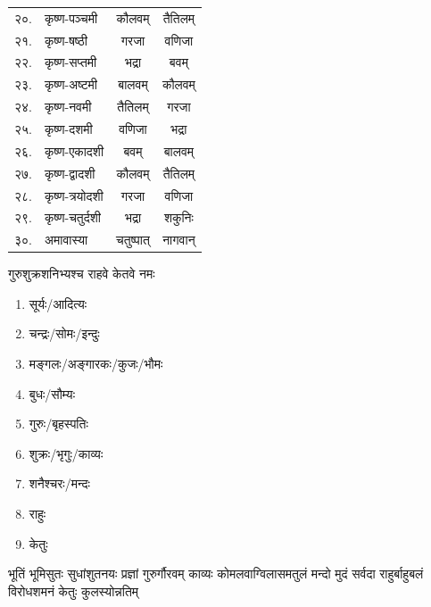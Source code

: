 \begin{longtable}{llcc}
  २०. & कृष्ण-पञ्चमी   & कौलवम्       & तैतिलम्        \\
  २१. & कृष्ण-षष्ठी    & गरजा        & वणिजा        \\
  २२. & कृष्ण-सप्तमी   & भद्रा        & बवम्          \\
  २३. & कृष्ण-अष्टमी   & बालवम्       & कौलवम्        \\
  २४. & कृष्ण-नवमी    & तैतिलम्       & गरजा         \\
  २५. & कृष्ण-दशमी    & वणिजा       & भद्रा         \\
  २६. & कृष्ण-एकादशी  & बवम्         & बालवम्        \\
  २७. & कृष्ण-द्वादशी  & कौलवम्       & तैतिलम्        \\
  २८. & कृष्ण-त्रयोदशी & गरजा        & वणिजा        \\
  २९. & कृष्ण-चतुर्दशी  & भद्रा        & शकुनिः        \\
  ३०. & अमावास्या    & चतुष्पात्      & नागवान्       \\
\end{longtable}
\endgroup


{गुरुशुक्रशनिभ्यश्च राहवे केतवे नमः}

\begin{minipage}{\linewidth}
\begin{enumerate}\itemsep-1ex

    \item सूर्यः/आदित्यः
    \item चन्द्रः/सोमः/इन्दुः
    \item मङ्गलः/अङ्गारकः/कुजः/भौमः
    \item बुधः/सौम्यः
    \item गुरुः/बृहस्पतिः
    \item शुक्रः/भृगुः/काव्यः
    \item शनैश्चरः/मन्दः
    \item राहुः
    \item केतुः

  \end{enumerate}
\end{minipage}

  {भूतिं भूमिसुतः सुधांशुतनयः प्रज्ञां गुरुर्गौरवम्}
  {काव्यः कोमलवाग्विलासमतुलं मन्दो मुदं सर्वदा}
  {राहुर्बाहुबलं विरोधशमनं केतुः कुलस्योन्नतिम्}
























